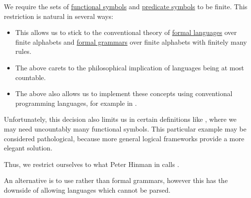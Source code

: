 \begin{remark}\label{rem:uncountable_first_order_language}
  We require the sets of \hyperref[def:first_order_language/fun]{functional symbols} and \hyperref[def:first_order_language/fun]{predicate symbols} to be finite. This restriction is natural in several ways:
  \begin{itemize}
    \item This allows us to stick to the conventional theory of \hyperref[def:formal_language/language]{formal languages} over finite alphabets and \hyperref[def:formal_grammar]{formal grammars} over finite alphabets with finitely many rules.

    \item The above carets to the philosophical implication of languages being at most countable.

    \item The above also allows us to implement these concepts using conventional programming languages, for example in \cite{notebook:code}.
  \end{itemize}

  Unfortunately, this decision also limits us in certain definitions like , where we may need uncountably many functional symbols. This particular example may be considered pathological, because more general logical frameworks provide a more elegant solution.

  Thus, we restrict ourselves to what Peter Hinman in  calls .

  An alternative is to use  rather than formal grammars, however this has the downside of allowing languages which cannot be parsed.
\end{remark}

